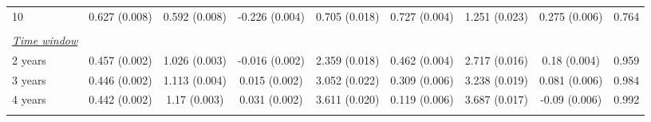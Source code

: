 \begin{tabular}{@{\extracolsep{5pt}} l cccccccc}
10 & 0.627 (0.008) & 0.592 (0.008) & -0.226 (0.004) & 0.705 (0.018) & 0.727 (0.004) & 1.251 (0.023) & 0.275 (0.006) & 0.764 \\ 
 &   &   &   &   &   &   &   &  \\ 
\underline{{\it Time window}} &   &   &   &   &   &   &   &  \\ 
2 years & 0.457 (0.002) & 1.026 (0.003) & -0.016 (0.002) & 2.359 (0.018) & 0.462 (0.004) & 2.717 (0.016) & 0.18 (0.004) & 0.959 \\ 
3 years & 0.446 (0.002) & 1.113 (0.004) & 0.015 (0.002) & 3.052 (0.022) & 0.309 (0.006) & 3.238 (0.019) & 0.081 (0.006) & 0.984 \\ 
4 years & 0.442 (0.002) & 1.17 (0.003) & 0.031 (0.002) & 3.611 (0.020) & 0.119 (0.006) & 3.687 (0.017) & -0.09 (0.006) & 0.992 \\ 
\hline \\[-1.8ex] 
\end{tabular} 
